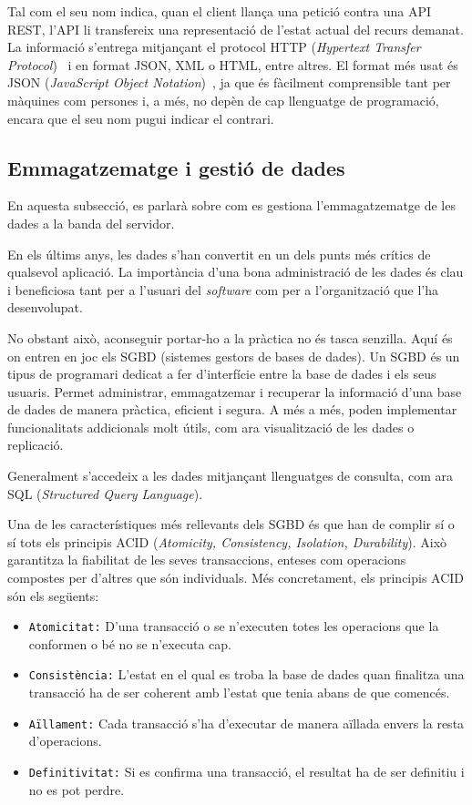\documentclass[a4paper,12pt]{ThesisStyle}
\begin{document}
Tal com el seu nom indica, quan el client llança una petició contra una API REST, l'API li transfereix una representació de l'estat actual del recurs demanat. La informació s'entrega mitjançant el protocol HTTP (\textit{Hypertext Transfer Protocol})~\cite{HTTP} i en format JSON, XML o HTML, entre altres. El format més usat és JSON (\textit{JavaScript Object Notation})~\cite{JSON}, ja que és fàcilment comprensible tant per màquines com persones i, a més, no depèn de cap llenguatge de programació, encara que el seu nom pugui indicar el contrari.

\subsection{Emmagatzematge i gestió de dades}
\label{subsec:emmagatzematge_dades}

En aquesta subsecció, es parlarà sobre com es gestiona l'emmagatzematge de les dades a la banda del servidor.

En els últims anys, les dades s'han convertit en un dels punts més crítics de qualsevol aplicació. La importància d'una bona administració de les dades és clau i beneficiosa tant per a l'usuari del \textit{software} com per a l'organització que l'ha desenvolupat.

No obstant això, aconseguir portar-ho a la pràctica no és tasca senzilla. Aquí és on entren en joc els SGBD (sistemes gestors de bases de dades). Un SGBD és un tipus de programari dedicat a fer d'interfície entre la base de dades i els seus usuaris. Permet administrar, emmagatzemar i recuperar la informació d'una base de dades de manera pràctica, eficient i segura. A més a més, poden implementar funcionalitats addicionals molt útils, com ara visualització de les dades o replicació.

Generalment s'accedeix a les dades mitjançant llenguatges de consulta, com ara SQL (\textit{Structured Query Language}).

Una de les característiques més rellevants dels SGBD és que han de complir sí o sí tots els principis ACID (\textit{Atomicity, Consistency, Isolation, Durability}). Això garantitza la fiabilitat de les seves transaccions, enteses com operacions compostes per d'altres que són individuals. Més concretament, els principis ACID són els següents:
\begin{itemize}
  \item \texttt{Atomicitat:} D'una transacció o se n'executen totes les operacions que la conformen o bé no se n'executa cap.
  \item \texttt{Consistència:} L'estat en el qual es troba la base de dades quan finalitza una transacció ha de ser coherent amb l'estat que tenia abans de que comencés.
  \item \texttt{Aïllament:} Cada transacció s'ha d'executar de manera aïllada envers la resta d'operacions.
  \item \texttt{Definitivitat:} Si es confirma una transacció, el resultat ha de ser definitiu i no es pot perdre.
\end{itemize}
\end{document}
